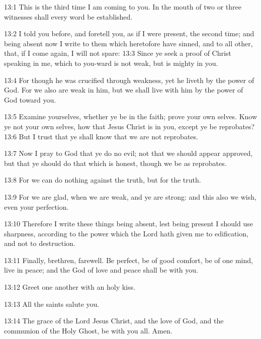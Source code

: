 13:1 This is the third time I am coming to you. In the mouth of two or
three witnesses shall every word be established.

13:2 I told you before, and foretell you, as if I were present, the
second time; and being absent now I write to them which heretofore
have sinned, and to all other, that, if I come again, I will not
spare: 13:3 Since ye seek a proof of Christ speaking in me, which to
you-ward is not weak, but is mighty in you.

13:4 For though he was crucified through weakness, yet he liveth by
the power of God. For we also are weak in him, but we shall live with
him by the power of God toward you.

13:5 Examine yourselves, whether ye be in the faith; prove your own
selves. Know ye not your own selves, how that Jesus Christ is in you,
except ye be reprobates?  13:6 But I trust that ye shall know that we
are not reprobates.

13:7 Now I pray to God that ye do no evil; not that we should appear
approved, but that ye should do that which is honest, though we be as
reprobates.

13:8 For we can do nothing against the truth, but for the truth.

13:9 For we are glad, when we are weak, and ye are strong: and this
also we wish, even your perfection.

13:10 Therefore I write these things being absent, lest being present
I should use sharpness, according to the power which the Lord hath
given me to edification, and not to destruction.

13:11 Finally, brethren, farewell. Be perfect, be of good comfort, be
of one mind, live in peace; and the God of love and peace shall be
with you.

13:12 Greet one another with an holy kiss.

13:13 All the saints salute you.

13:14 The grace of the Lord Jesus Christ, and the love of God, and the
communion of the Holy Ghost, be with you all. Amen.

